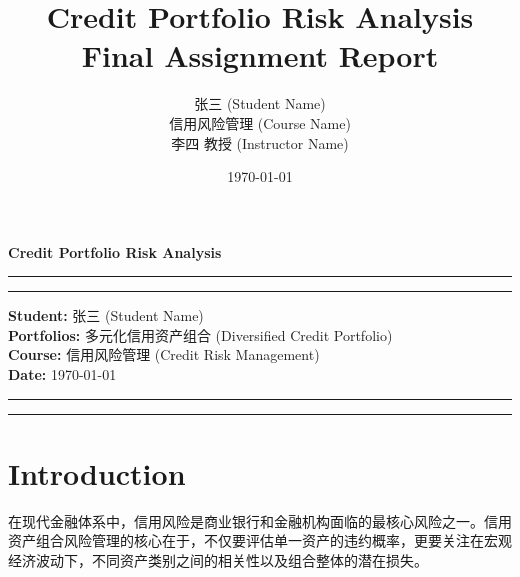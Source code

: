 \documentclass[12pt]{article}
\title{
    \vspace{4cm}
    {\Huge \bfseries Credit Portfolio Risk Analysis} \\
    \vspace{1.5cm}
    {\Large Final Assignment Report} \\
    \vspace{2cm}
}
\author{
    \Large 张三 (Student Name) \\
    \vspace{0.5cm}
    信用风险管理 (Course Name) \\
    李四 教授 (Instructor Name)
}
\date{\today}
\begin{document}

\begin{titlepage}
    \centering

    \vspace*{2cm}

    {\Huge \bfseries Credit Portfolio Risk Analysis \par}

    \vspace{2cm}

    \rule{0.8\textwidth}{0.5pt}
    \rule{0.8\textwidth}{0.5pt}

    \vspace{3cm}

    \begin{center}
    \large
    \textbf{Student:} 张三 (Student Name) \\
    \vspace{0.3cm}
    \textbf{Portfolios:} 多元化信用资产组合 (Diversified Credit Portfolio) \\
    \vspace{0.3cm}
    \textbf{Course:} 信用风险管理 (Credit Risk Management) \\
    \vspace{0.3cm}
    \textbf{Date:} \today
    \end{center}

    \vspace{3cm}

    \rule{0.8\textwidth}{0.5pt}
    \rule{0.8\textwidth}{0.5pt}

\end{titlepage}


\newpage

\tableofcontents

\newpage


\section{Introduction}
在现代金融体系中，信用风险是商业银行和金融机构面临的最核心风险之一。信用资产组合风险管理的核心在于，不仅要评估单一资产的违约概率，更要关注在宏观经济波动下，不同资产类别之间的相关性以及组合整体的潜在损失。
\end{document}
